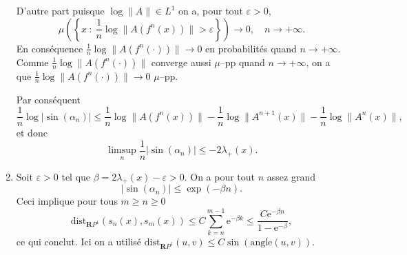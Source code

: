 \documentclass[a4paper,12pt,openany]{article}
\theoremstyle{plain}
\theoremstyle{definition}
\newcommand{\e}{\mathrm{e}}
\newcommand{\R}{\mathbf{R}}
\newcommand{\dist}{\mathrm{dist}}
\begin{document}
\begin{enumerate}
D'autre part puisque $\log \|A\| \in L^1$ on a, pour tout $\varepsilon > 0$,
$$
\mu\left(\left\{x~:~\frac{1}{n} \log \|A(f^n(x))\| > \varepsilon \right\}\right) \to 0, \quad n \to +\infty.
$$
 En cons\'equence $\frac{1}{n} \log \|A(f^n(\cdot))\| \to 0$ en probabilit\'es quand $n \to +\infty.$
Comme $\frac{1}{n} \log \|A(f^n(\cdot))\|$ converge aussi $\mu$--pp quand $n \to +\infty$, on a que $\frac{1}{n} \log \|A(f^n(\cdot))\| \to 0$ $\mu$--pp.  

Par cons\'equent
$$
\frac{1}{n} \log |\sin(\alpha_n)| \leqslant \frac{1}{n} \log \|A(f^n(x))\| - \frac{1}{n} \log \|A^{n+1}(x)\| - \frac{1}{n} \log \|A^{n}(x)\|,
$$
 et donc 
$$
\limsup_n \frac{1}{n} |\sin(\alpha_n)| \leqslant -2\lambda_+(x).
$$

\item Soit $\varepsilon > 0$ tel que $\beta = 2 \lambda_+(x) - \varepsilon > 0.$ On a pour tout $n$ assez grand
$$
|\sin(\alpha_n)| \leqslant \exp\left(-\beta n\right).
$$
 Ceci implique pour tous $m\geqslant n \geqslant 0$
$$
\mathrm{dist}_{\R P^1}(s_n(x), s_m(x)) \leqslant C \sum_{k=n}^{m-1} \e^{-\beta k} \leqslant \frac{C\e^{-\beta n}}{1 - \e^{-\beta}},
$$
ce qui conclut.  Ici on a utilis\'e $\dist_{\R P^1}(u,v) \leqslant C\sin(\mathrm{angle}(u,v))$.


\end{enumerate}
\end{document}
